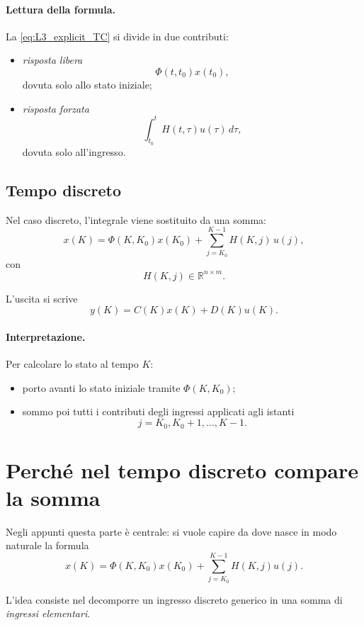 \paragraph{Lettura della formula.}
La \eqref{eq:L3_explicit_TC} si divide in due contributi:
\begin{itemize}
    \item \emph{risposta libera}
    \[
    \Phi(t,t_0)x(t_0),
    \]
    dovuta solo allo stato iniziale;
    \item \emph{risposta forzata}
    \[
    \int_{t_0}^{t} H(t,\tau)u(\tau)\,d\tau,
    \]
    dovuta solo all'ingresso.
\end{itemize}

\subsection{Tempo discreto}

Nel caso discreto, l'integrale viene sostituito da una somma:
\begin{equation}
x(K)=\Phi(K,K_0)x(K_0)+\sum_{j=K_0}^{K-1} H(K,j)\,u(j),
\label{eq:L3_explicit_TD}
\end{equation}
con
\[
H(K,j)\in\mathbb{R}^{n\times m}.
\]

L'uscita si scrive
\begin{equation}
y(K)=C(K)x(K)+D(K)u(K).
\label{eq:L3_TD_output}
\end{equation}

\paragraph{Interpretazione.}
Per calcolare lo stato al tempo $K$:
\begin{itemize}
    \item porto avanti lo stato iniziale tramite $\Phi(K,K_0)$;
    \item sommo poi tutti i contributi degli ingressi applicati agli istanti
    \[
    j=K_0,K_0+1,\dots,K-1.
    \]
\end{itemize}

\section{Perché nel tempo discreto compare la somma}

Negli appunti questa parte è centrale: si vuole capire da dove nasce in modo naturale la formula
\[
x(K)=\Phi(K,K_0)x(K_0)+\sum_{j=K_0}^{K-1}H(K,j)u(j).
\]

L'idea consiste nel decomporre un ingresso discreto generico in una somma di \emph{ingressi elementari}.

